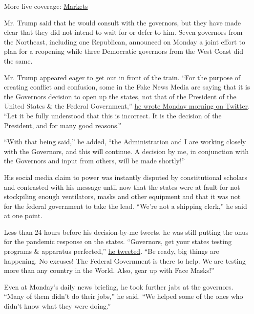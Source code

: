 More live coverage:
\href{https://www.nytimes3xbfgragh.onion/live/2020/09/11/business/stock-market-today-coronavirus?action=click\&pgtype=Article\&state=default\&region=MAIN_CONTENT_1\&context=storylines_live_updates}{Markets}

Mr. Trump said that he would consult with the governors, but they have
made clear that they did not intend to wait for or defer to him. Seven
governors from the Northeast, including one Republican, announced on
Monday a joint effort to plan for a reopening while three Democratic
governors from the West Coast did the same.

Mr. Trump appeared eager to get out in front of the train. ``For the
purpose of creating conflict and confusion, some in the Fake News Media
are saying that it is the Governors decision to open up the states, not
that of the President of the United States \& the Federal Government,''
\href{https://twitter.com/realDonaldTrump/status/1249712404260421633}{he
wrote Monday morning on Twitter}. ``Let it be fully understood that this
is incorrect. It is the decision of the President, and for many good
reasons.''

``With that being said,''
\href{https://twitter.com/realDonaldTrump/status/1249712413219397632}{he
added}, ``the Administration and I are working closely with the
Governors, and this will continue. A decision by me, in conjunction with
the Governors and input from others, will be made shortly!''

His social media claim to power was instantly disputed by constitutional
scholars and contrasted with his message until now that the states were
at fault for not stockpiling enough ventilators, masks and other
equipment and that it was not for the federal government to take the
lead. ``We're not a shipping clerk,'' he said at one point.

Less than 24 hours before his decision-by-me tweets, he was still
putting the onus for the pandemic response on the states. ``Governors,
get your states testing programs \& apparatus perfected,''
\href{https://twitter.com/realDonaldTrump/status/1249453028178001920}{he
tweeted}. ``Be ready, big things are happening. No excuses! The Federal
Government is there to help. We are testing more than any country in the
World. Also, gear up with Face Masks!''

Even at Monday's daily news briefing, he took further jabs at the
governors. ``Many of them didn't do their jobs,'' he said. ``We helped
some of the ones who didn't know what they were doing.''

